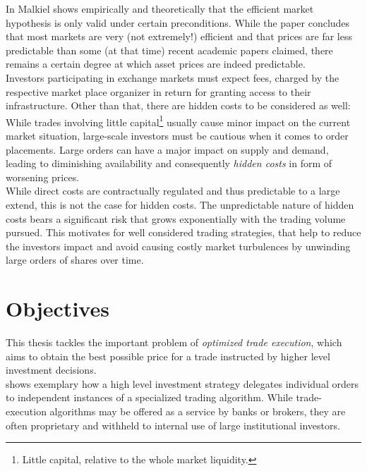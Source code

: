 In \Cite{TheEfficentMarketHypothesisAndItsCritics} Malkiel shows empirically and theoretically that the efficient market hypothesis is only valid under certain preconditions. While the paper concludes that most markets are very (not extremely!) efficient and that prices are far less predictable than some (at that time) recent academic papers claimed, there remains a certain degree at which asset prices are indeed predictable.\\

Investors participating in exchange markets must expect fees, charged by the respective market place organizer in return for granting access to their infrastructure. Other than that, there are hidden costs to be considered as well: While trades involving little capital\footnote{Little capital, relative to the whole market liquidity.} usually cause minor impact on the current market situation, large-scale investors must be cautious when it comes to order placements. Large orders can have a major impact on supply and demand, leading to diminishing availability and consequently \emph{hidden costs} in form of worsening prices.\\

While direct costs are contractually regulated and thus predictable to a large extend, this is not the case for hidden costs. The unpredictable nature of hidden costs bears a significant risk that grows exponentially with the trading volume pursued. This motivates for well considered trading strategies, that help to reduce the investors impact and avoid causing costly market turbulences by unwinding large orders of shares over time.



\section{Objectives}
\label{sec:objectives}
This thesis tackles the important problem of \emph{optimized trade execution}, which aims to obtain the best possible price for a trade instructed by higher level investment decisions.\\

 shows exemplary how a high level investment strategy delegates individual orders to independent instances of a specialized trading algorithm. While trade-execution algorithms may be offered as a service by banks or brokers, they are often proprietary and withheld to internal use of large institutional investors.\\




